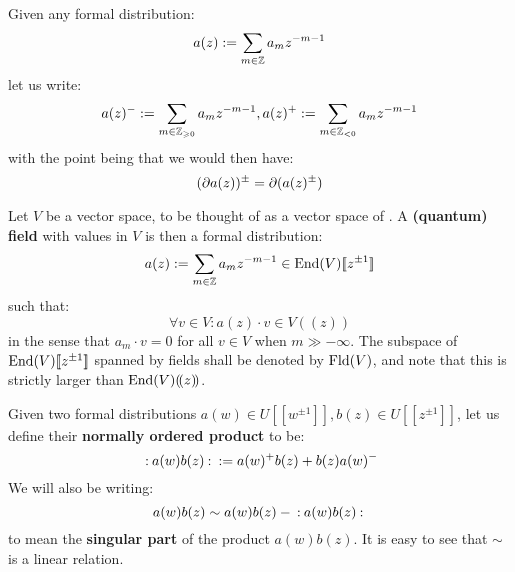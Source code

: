         \begin{convention}
            Given any formal distribution:
                $$a(z) := \sum_{m \in \mathbb{Z}} a_m z^{-m - 1}$$
            let us write:
                $$a(z)^- := \sum_{m \in \mathbb{Z}_{\geqslant 0}} a_m z^{-m - 1}, a(z)^+ := \sum_{m \in \mathbb{Z}_{< 0}} a_m z^{-m - 1}$$
            with the point being that we would then have:
                $$(\partial a(z))^{\pm} = \partial( a(z)^{\pm} )$$
        \end{convention}
        \begin{definition} \label{def: quantum_fields}
            Let $V$ be a vector space, to be thought of as a vector space of . A \textbf{(quantum) field} with values in $V$ is then a formal distribution:
                $$a(z) := \sum_{m \in \mathbb{Z}} a_m z^{-m - 1} \in \mathrm{End}(V)[\![z^{\pm 1}]\!]$$
            such that:
                $$\forall v \in V: a(z) \cdot v \in V(\!(z)\!)$$
            in the sense that $a_m \cdot v = 0$ for all $v \in V$ when $m \gg -\infty$. The subspace of $\mathrm{End}(V)[\![z^{\pm 1}]\!]$ spanned by fields shall be denoted by $\mathrm{Fld}(V)$, and note that this is strictly larger than $\mathrm{End}(V)(\!(z)\!)$.
        \end{definition}
        \begin{definition} \label{def: normal_ordering}
            Given two formal distributions $a(w) \in U[\![w^{\pm 1}]\!], b(z) \in U[\![z^{\pm 1}]\!]$, let us define their \textbf{normally ordered product} to be:
                $$\: \mathbf{:} \: { a(w) b(z) }  \: \mathbf{:} \: := a(w)^+ b(z) + b(z) a(w)^-$$
            We will also be writing:
                $$a(w) b(z) \sim a(w) b(z) - \: \mathbf{:} \: { a(w) b(z) }  \: \mathbf{:} \:$$
            to mean the \textbf{singular part} of the product $a(w) b(z)$. It is easy to see that $\sim$ is a linear relation.
        \end{definition}
